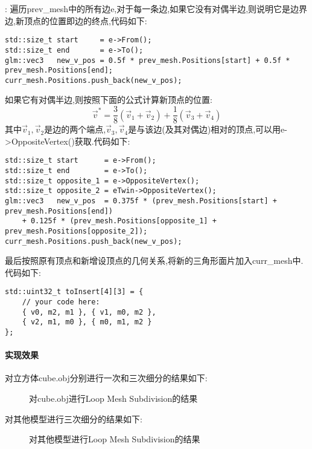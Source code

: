 \documentclass{ctexart}
\begin{document}
\indent {}:
遍历{\codefont prev\_mesh}中的所有边{\codefont e},对于每一条边,如果它没有对偶半边,则说明它是边界边,新顶点的位置即边的终点,代码如下:
\begin{lstlisting}
std::size_t start     = e->From();
std::size_t end       = e->To();
glm::vec3   new_v_pos = 0.5f * prev_mesh.Positions[start] + 0.5f * prev_mesh.Positions[end];
curr_mesh.Positions.push_back(new_v_pos);
\end{lstlisting}
如果它有对偶半边,则按照下面的公式计算新顶点的位置:
\[\vec{v}^\ast=\frac{3}{8}(\vec{v}_1+\vec{v}_2)+\frac{1}{8}(\vec{v}_3+\vec{v}_4)\]
其中$\vec{v}_1,\vec{v}_2$是边的两个端点,$\vec{v}_3,\vec{v}_4$是与该边(及其对偶边)相对的顶点,可以用{\codefont e->OppositeVertex()}获取.代码如下:
\begin{lstlisting}
std::size_t start      = e->From();
std::size_t end        = e->To();
std::size_t opposite_1 = e->OppositeVertex();
std::size_t opposite_2 = eTwin->OppositeVertex();
glm::vec3   new_v_pos  = 0.375f * (prev_mesh.Positions[start] + prev_mesh.Positions[end])
    + 0.125f * (prev_mesh.Positions[opposite_1] + prev_mesh.Positions[opposite_2]);
curr_mesh.Positions.push_back(new_v_pos);
\end{lstlisting}
最后按照原有顶点和新增设顶点的几何关系,将新的三角形面片加入{\codefont curr\_mesh}中.代码如下:
\begin{lstlisting}
std::uint32_t toInsert[4][3] = {
    // your code here:
    { v0, m2, m1 }, { v1, m0, m2 },
    { v2, m1, m0 }, { m0, m1, m2 }
};
\end{lstlisting}
\paragraph{实现效果}
对立方体{\codefont cube.obj}分别进行一次和三次细分的结果如下:
\begin{figure}[H]
    \centering
    \qquad\qquad
    \caption{对{\codefont cube.obj}进行Loop Mesh Subdivision的结果}
\end{figure}
对其他模型进行三次细分的结果如下:
\begin{figure}[H]
    \centering
    \qquad\qquad
    \qquad\qquad
    \qquad\qquad
    \caption{对其他模型进行Loop Mesh Subdivision的结果}
\end{figure}
\end{document}
